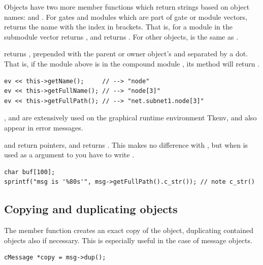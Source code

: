 Objects have two more member functions which return strings
based on object names:  and .
For gates and modules which are part of gate or module vectors,
 returns the name with the index in brackets.
That is, for a module  in the submodule vector 
 returns , and  returns .
For other objects,  is the same as .

 returns , prepended with the
parent or owner object's  and separated by a dot.
That is, if the  module above is in the compound module
, its  method will return
.

\begin{verbatim}
ev << this->getName();     // --> "node"
ev << this->getFullName(); // --> "node[3]"
ev << this->getFullPath(); // --> "net.subnet1.node[3]"
\end{verbatim}

,  and 
are extensively used on the graphical runtime environment Tkenv,
and also appear in error messages.

 and  return  pointers,
and  returns . This makes no difference
with , but when  is used as a  argument
to  you have to write .

\begin{verbatim}
char buf[100];
sprintf("msg is '%80s'", msg->getFullPath().c_str()); // note c_str()
\end{verbatim}


\subsection{Copying and duplicating objects}


The  member function creates an exact copy of the
object, duplicating
contained objects also if necessary. This is especially useful in the
case of message objects.

\begin{verbatim}
cMessage *copy = msg->dup();
\end{verbatim}

